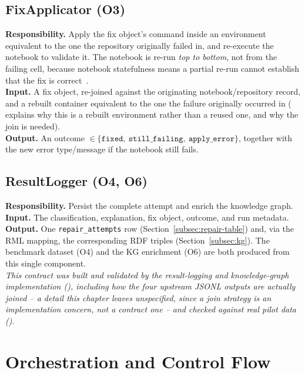 \subsection{FixApplicator (O3)}
\label{subsec:fixapplicator}
\textbf{Responsibility.} Apply the fix object's command inside an
environment equivalent to the one the repository originally failed in, and
re-execute the notebook to validate it. The notebook is re-run \emph{top to
bottom}, not from the failing cell, because notebook statefulness means a
partial re-run cannot establish that the fix is correct~\cite{grotov2024debug}.\\
\textbf{Input.} A fix object, re-joined against the originating
notebook/repository record, and a rebuilt container equivalent to the one
the failure originally occurred in ( explains why this
is a rebuilt environment rather than a reused one, and why the join is
needed).\\
\textbf{Output.} An outcome
$\in \{\texttt{fixed},\ \texttt{still\_failing},\ \texttt{apply\_error}\}$,
together with the new error type/message if the notebook still fails.

\subsection{ResultLogger (O4, O6)}
\label{subsec:resultlogger}
\textbf{Responsibility.} Persist the complete attempt and enrich the
knowledge graph.\\
\textbf{Input.} The classification, explanation, fix object, outcome, and
run metadata.\\
\textbf{Output.} One \texttt{repair\_attempts} row
(Section~\ref{subsec:repair-table}) and, via the RML mapping, the
corresponding RDF triples (Section~\ref{subsec:kg}). The benchmark
dataset (O4) and the KG enrichment (O6) are both produced from this
single component.\\
\emph{This contract was built and validated by the result-logging and
knowledge-graph implementation (), including how
the four upstream JSONL outputs are actually joined -- a detail this
chapter leaves unspecified, since a join strategy is an implementation
concern, not a contract one -- and checked against real pilot data
().}

\section{Orchestration and Control Flow}
\label{sec:orchestrator}

